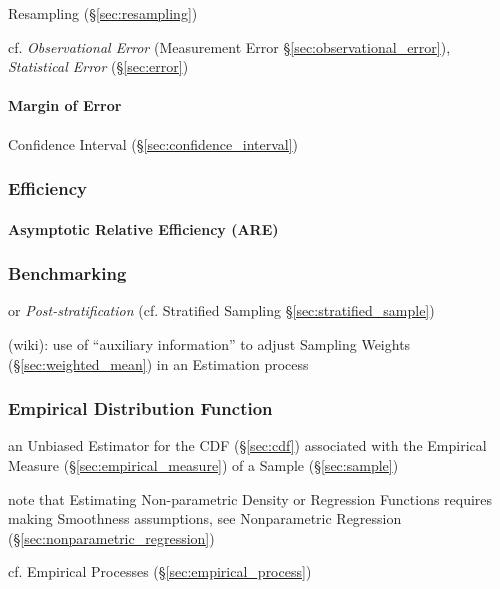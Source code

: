 \fist Resampling (\S\ref{sec:resampling})

\fist cf. \emph{Observational Error} (Measurement Error
\S\ref{sec:observational_error}), \emph{Statistical Error} (\S\ref{sec:error})



\paragraph{Margin of Error}\label{sec:margin_of_error}\hfill

\fist Confidence Interval (\S\ref{sec:confidence_interval})



\subsubsection{Efficiency}\label{sec:efficiency}

\paragraph{Asymptotic Relative Efficiency (ARE)}\label{sec:are}\hfill



\subsubsection{Benchmarking}\label{sec:benchmarking}

or \emph{Post-stratification} (cf. Stratified Sampling
\S\ref{sec:stratified_sample})

(wiki): use of ``auxiliary information'' to adjust Sampling Weights
(\S\ref{sec:weighted_mean}) in an Estimation process



\subsubsection{Empirical Distribution Function}
\label{sec:empirical_distribution}

an Unbiased Estimator for the CDF (\S\ref{sec:cdf}) associated with the
Empirical Measure (\S\ref{sec:empirical_measure}) of a Sample
(\S\ref{sec:sample})

note that Estimating Non-parametric Density or Regression Functions requires
making Smoothness assumptions, see Nonparametric Regression
(\S\ref{sec:nonparametric_regression})

\fist cf. Empirical Processes (\S\ref{sec:empirical_process})

